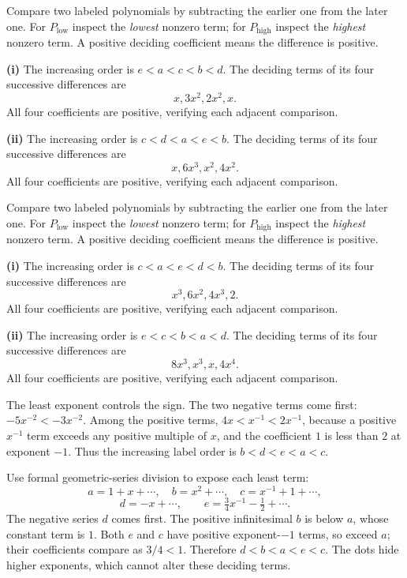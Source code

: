 Compare two labeled polynomials by subtracting the earlier one from the later one. For $P_{\mathrm{low}}$ inspect the \emph{lowest} nonzero term; for $P_{\mathrm{high}}$ inspect the \emph{highest} nonzero term. A positive deciding coefficient means the difference is positive.\par
\textbf{(i)} The increasing order is $\boxed{e<a<c<b<d}$. The deciding terms of its four successive differences are
\[x, 3x^{2}, 2x^{2}, x.
\]
All four coefficients are positive, verifying each adjacent comparison.\par
\textbf{(ii)} The increasing order is $\boxed{c<d<a<e<b}$. The deciding terms of its four successive differences are
\[x, 6x^{3}, x^{2}, 4x^{2}.
\]
All four coefficients are positive, verifying each adjacent comparison.\par


Compare two labeled polynomials by subtracting the earlier one from the later one. For $P_{\mathrm{low}}$ inspect the \emph{lowest} nonzero term; for $P_{\mathrm{high}}$ inspect the \emph{highest} nonzero term. A positive deciding coefficient means the difference is positive.\par
\textbf{(i)} The increasing order is $\boxed{c<a<e<d<b}$. The deciding terms of its four successive differences are
\[x^{3}, 6x^{2}, 4x^{3}, 2.
\]
All four coefficients are positive, verifying each adjacent comparison.\par
\textbf{(ii)} The increasing order is $\boxed{e<c<b<a<d}$. The deciding terms of its four successive differences are
\[8x^{3}, x^{3}, x, 4x^{4}.
\]
All four coefficients are positive, verifying each adjacent comparison.\par


The least exponent controls the sign. The two negative terms come first: $-5x^{-2}<-3x^{-2}$. Among the positive terms, $4x<x^{-1}<2x^{-1}$, because a positive $x^{-1}$ term exceeds any positive multiple of $x$, and the coefficient $1$ is less than $2$ at exponent $-1$. Thus the increasing label order is $\boxed{b<d<e<a<c}$.

Use formal geometric-series division to expose each least term:
\[a=1+x+\cdots,\quad b=x^2+\cdots,\quad c=x^{-1}+1+\cdots,
\]
\[d=-x+\cdots,\qquad e=\tfrac34x^{-1}-\tfrac12+\cdots.
\]
The negative series $d$ comes first. The positive infinitesimal $b$ is below $a$, whose constant term is $1$. Both $e$ and $c$ have positive exponent-$-1$ terms, so exceed $a$; their coefficients compare as $3/4<1$. Therefore $\boxed{d<b<a<e<c}$. The dots hide higher exponents, which cannot alter these deciding terms.

